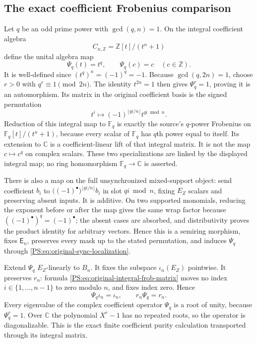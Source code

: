 \subsection{The exact coefficient Frobenius comparison}

Let $q$ be an odd prime power with $\gcd(q,n)=1$.
On the integral coefficient algebra
\[
 C_{n,\mathbb Z}=\mathbb Z[t]/(t^n+1)
\]
define the unital algebra map
\[
 \Psi_q(t)=t^q,\qquad \Psi_q(c)=c\quad(c\in\mathbb Z).
\]
It is well-defined since $(t^q)^n=(-1)^q=-1$.
Because $\gcd(q,2n)=1$, choose $r>0$ with $q^r\equiv1\pmod{2n}$.
The identity $t^{2n}=1$ then gives $\Psi_q^r=1$, proving it is an
automorphism. Its matrix in the original coefficient basis is the
signed permutation
\begin{equation}
 t^i\longmapsto(-1)^{\lfloor qi/n\rfloor}t^{qi\bmod n}.
 \label{PS:eq:original-integral-frob-matrix}
\end{equation}
Reduction of this integral map to $\mathbb F_q$ is exactly the
source's $q$-power Frobenius on $\mathbb F_q[t]/(t^n+1)$, because
every scalar of $\mathbb F_q$ has $q$th power equal to itself.
Its extension to $\mathbb C$ is a coefficient-linear lift of that
integral matrix. It is not the map $c\mapsto c^q$ on complex scalars.
These two specializations are linked by the displayed integral map;
no ring homomorphism $\mathbb F_q\to\mathbb C$ is asserted.

There is also a map on the full unsynchronized mixed-support object:
send coefficient $b_i$ to
$\bigl((-1)^\bullet\bigr)^{\lfloor qi/n\rfloor}b_i$ in slot $qi\bmod n$,
fixing $E_Z$ scalars and preserving absent inputs. It is additive.
On two supported monomials, reducing the exponent before or after
the map gives the same wrap factor because $((-1)^\bullet)^q=(-1)^\bullet$;
the absent cases are absorbed, and distributivity proves the product
identity for arbitrary vectors. Hence this is a semiring morphism,
fixes $\mathsf E_n$, preserves every mask up to the stated permutation,
and induces $\Psi_q$ through \eqref{PS:eq:original-sync-localization}.

Extend $\Psi_q$ $E_Z$-linearly to $B_n$. It fixes the subspace
$\iota_n(E_Z)$ pointwise. It preserves $r_n$: formula
\eqref{PS:eq:original-integral-frob-matrix} moves no index
$i\in\{1,\ldots,n-1\}$ to zero modulo $n$, and fixes index zero.
Hence
\begin{equation}
 \Psi_q\iota_n=\iota_n,\qquad r_n\Psi_q=r_n.
 \label{PS:eq:original-frob-retract}
\end{equation}
Every eigenvalue of the complex coefficient operator $\Psi_q$ is
a root of unity, because $\Psi_q^r=1$. Over $\mathbb C$ the
polynomial $X^r-1$ has no repeated roots, so the operator is
diagonalizable. This is the exact finite coefficient purity
calculation transported through its integral matrix.

